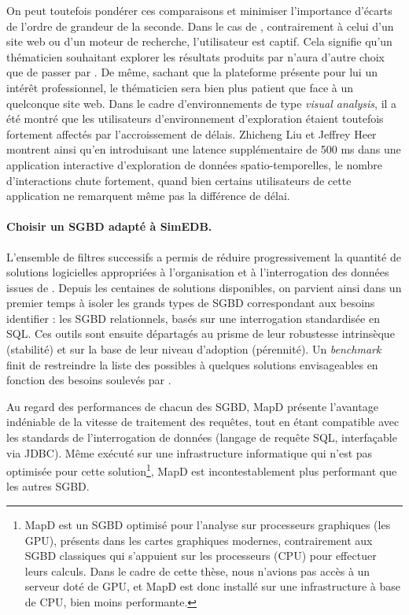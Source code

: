 On peut toutefois pondérer ces comparaisons et minimiser l'importance d'écarts de l'ordre de grandeur de la seconde.
Dans le cas de \simedb{}, contrairement à celui d'un site web ou d'un moteur de recherche, l'utilisateur est \og captif\fg{}.
Cela signifie qu'un thématicien souhaitant explorer les résultats produits par \simfeodal{} n'aura d'autre choix que de passer par \simedb{}.
De même, sachant que la plateforme présente pour lui un intérêt professionnel, le thématicien sera bien plus patient que face à un quelconque site web.
Dans le cadre d'environnements de type \textit{visual analysis}, il a été montré que les utilisateurs d'environnement d'exploration étaient toutefois fortement affectés par l'accroissement de délais.
Zhicheng Liu et Jeffrey Heer \autocite{liu_effects_2014} montrent ainsi qu'en introduisant une latence supplémentaire de 500 ms dans une application interactive d'exploration de données spatio-temporelles, le nombre d'interactions chute fortement, quand bien certains utilisateurs de cette application ne remarquent même pas la différence de délai.

\paragraph{Choisir un SGBD adapté à SimEDB.} L'ensemble de filtres successifs a permis de réduire progressivement la quantité de solutions logicielles appropriées à l'organisation et à l'interrogation des données issues de \simfeodal{}.
Depuis les centaines de solutions disponibles, on parvient ainsi dans un premier temps à isoler les grands types de SGBD correspondant aux besoins identifier : les SGBD relationnels, basés sur une interrogation standardisée en SQL.
Ces outils sont ensuite départagés au prisme de leur robustesse intrinsèque (stabilité) et sur la base de leur niveau d'adoption (pérennité).
Un \textit{benchmark} finit de restreindre la liste des possibles à quelques solutions envisageables en fonction des besoins soulevés par \simedb{}.

Au regard des performances de chacun des SGBD, MapD \autocite{root_mapd_2016} présente l'avantage indéniable de la vitesse de traitement des requêtes, tout en étant compatible avec les standards de l'interrogation de données (langage de requête SQL, interfaçable via \textsf{JDBC}).
Même exécuté sur une infrastructure informatique qui n'est pas optimisée pour cette solution\footnote{
	MapD est un SGBD optimisé pour l'analyse sur processeurs graphiques (les GPU), présents dans les cartes graphiques modernes, contrairement aux SGBD classiques qui s'appuient sur les processeurs (CPU) pour effectuer leurs calculs.
	Dans le cadre de cette thèse, nous n'avions pas accès à un serveur doté de GPU, et MapD est donc installé sur une infrastructure à base de CPU, bien moins performante.
}, MapD est incontestablement plus performant que les autres SGBD.


